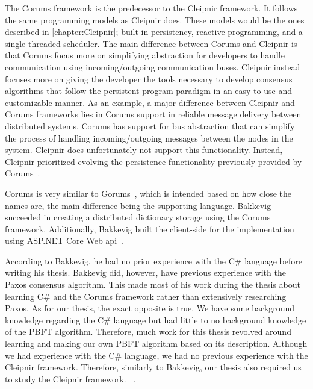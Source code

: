 The Corums framework is the predecessor to the Cleipnir framework. It follows the same programming models as Cleipnir does. These models would be the ones described in \autoref{chapter:Cleipnir}; built-in persistency, reactive programming, and a single-threaded scheduler.
The main difference between Corums and Cleipnir is that Corums focus more on simplifying abstraction for developers to handle communication using incoming/outgoing communication buses. Cleipnir instead focuses more on giving the developer the tools necessary to develop consensus algorithms that follow the persistent program paradigm in an easy-to-use and customizable manner. As an example, a major difference between Cleipnir and Corums frameworks lies in Corums support in reliable message delivery between distributed systems. Corums has support for bus abstraction that can simplify the process of handling incoming/outgoing messages between the nodes in the system. Cleipnir does unfortunately not support this functionality. Instead, Cleipnir prioritized evolving the persistence functionality previously provided by Corums~\cites[p.~6-7]{PAPER:PaxosCleipnir}{DOC:Cleipnir}.
 
Corums is very similar to Gorums~\cites{WEB:Gorums}[p.~22]{PAPER:EivindPaper}, which is intended based on how close the names are, the main difference being the supporting language.
Bakkevig succeeded in creating a distributed dictionary storage using the Corums framework. Additionally, Bakkevig built the client-side for the implementation using ASP.NET Core Web \ac{api}~\cite{WEB:ASPNetCoreAPI}.
 
According to Bakkevig, he had no prior experience with the C\# language before writing his thesis. Bakkevig did, however, have previous experience with the Paxos consensus algorithm. This made most of his work during the thesis about learning C\# and the Corums framework rather than extensively researching Paxos. As for our thesis, the exact opposite is true. We have some background knowledge regarding the C\# language but had little to no background knowledge of the PBFT algorithm. Therefore, much work for this thesis revolved around learning and making our own PBFT algorithm based on its description. Although we had experience with the C\# language, we had no previous experience with the Cleipnir framework. Therefore, similarly to Bakkevig, our thesis also required us to study the Cleipnir framework. ~\cite[p.~8]{PAPER:EivindPaper}.
